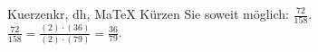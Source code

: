 \begin{MAufgabe}{Kuerzen}{kr, dh, MaTeX}
K\"urzen Sie soweit m\"oglich: $\frac{72}{158}$.\\ 
\ifLsg\MLoesung
\quad $\frac{72}{158}=\frac{(2)\cdot(36)}{(2)\cdot(79)}=\frac{36}{79}$.\else\relax\fi
 \end{MAufgabe}